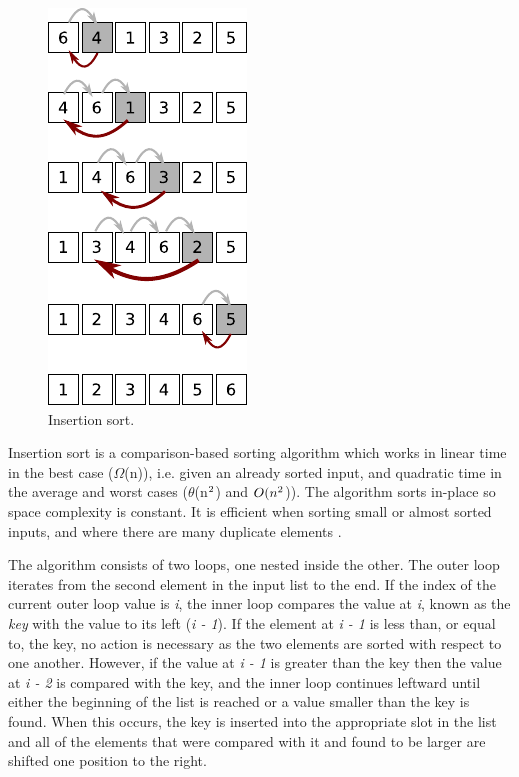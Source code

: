 \documentclass[12pt, a4paper]{article}
\begin{document}
\begin{figure}
    \centering
    \includegraphics{insertion_sort.pdf}
    \caption{\label{fig:insertion_sort}Insertion sort.}
\end{figure}

Insertion sort is a comparison-based sorting algorithm which works in linear time in the best case ($\Omega$(n)), i.e. given an already sorted input, and quadratic time in the average and worst cases ($\theta$(n$\textsuperscript{2}$) and $O(n\textsuperscript{2}$)). The algorithm sorts in-place so space complexity is constant. It is efficient when sorting small or almost sorted inputs, and where there are many duplicate elements \autocite[p. 60]{heineman2016algorithms}.

The algorithm consists of two loops, one nested inside the other. The outer loop iterates from the second element in the input list to the end. If the index of the current outer loop value is \emph{i}, the inner loop compares the value at \emph{i}, known as the \emph{key} with the value to its left (\emph{i - 1}). If the element at \emph{i - 1} is less than, or equal to, the key, no action is necessary as the two elements are sorted with respect to one another. However, if the value at \emph{i - 1} is greater than the key then the value at \emph{i - 2} is compared with the key, and the inner loop continues leftward until either the beginning of the list is reached or a value smaller than the key is found. When this occurs, the key is inserted into the appropriate slot in the list and all of the elements that were compared with it and found to be larger are shifted one position to the right.
\end{document}
